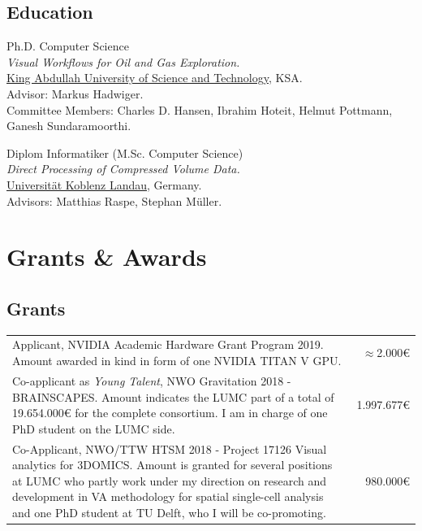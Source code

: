 \documentclass[10pt,a4paper,roman,final]{moderncv}
\begin{document}
\subsection*{Education}
\begin{description}[style=multiline,leftmargin=3.5cm,font=\normalfont]
\item[04/2013]
Ph.D. Computer Science\\
\emph{Visual Workflows for Oil and Gas Exploration.}\\
\href{https://www.kaust.edu.sa}{King Abdullah University of Science and Technology}, KSA.\\
Advisor: Markus Hadwiger.\\
Committee Members: Charles D. Hansen, Ibrahim Hoteit, Helmut Pottmann, Ganesh Sundaramoorthi.

\item[08/2008]
Diplom Informatiker (M.Sc. Computer Science)\\
\emph{Direct Processing of Compressed Volume Data.}\\
\href{https://www.uni-koblenz.de}{Universität Koblenz Landau}, Germany.\\
Advisors: Matthias Raspe, Stephan Müller.

\end{description}

\newpage


\section*{Grants \& Awards}
\renewcommand{\arraystretch}{1.75}

\subsection*{Grants}
\vspace{-5mm}
\begin{tabularx}{\textwidth}{@{}X@{\hspace{2em}}r@{}}
Applicant, NVIDIA Academic Hardware Grant Program 2019. Amount awarded in kind in form of one NVIDIA TITAN V GPU. & $\approx$2.000\euro{}\\
Co-applicant as \emph{Young Talent}, NWO Gravitation 2018 - BRAINSCAPES. Amount indicates the LUMC part of a total of 19.654.000\euro{} for the complete consortium. I am in charge of one PhD student on the LUMC side. & 1.997.677\euro{}\\
Co-Applicant, NWO/TTW HTSM 2018 - Project 17126 Visual analytics for 3DOMICS. Amount is granted for several positions at LUMC who partly work under my direction on research and development in VA methodology for spatial single-cell analysis and one PhD student at TU Delft, who I will be co-promoting. & 980.000\euro{}\\
\end{tabularx}
\end{document}

